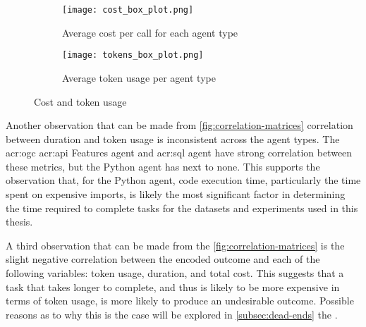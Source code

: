 \begin{figure}[htbp]
    \centering
    \begin{subfigure}[b]{0.48\textwidth}
        \centering
        \texttt{[image: cost\_box\_plot.png]}
        \caption{Average cost per call for each agent type}
        \label{fig:cost-box-plot}
    \end{subfigure}
    \hfill
    \begin{subfigure}[b]{0.48\textwidth}
        \centering
        \texttt{[image: tokens\_box\_plot.png]}
        \caption{Average token usage per agent type}
        \label{fig:tokens-box-plot}
    \end{subfigure}
    \caption{Cost and token usage}
    \label{fig:cost-and-tokens}
\end{figure}

Another observation that can be made from \autoref{fig:correlation-matrices} correlation between duration and token usage is inconsistent across the agent types. The \acrshort{acr:ogc} \acrshort{acr:api} Features agent and \acrshort{acr:sql} agent have strong correlation between these metrics, but the Python agent has next to none. This supports the observation that, for the Python agent, code execution time, particularly the time spent on expensive imports, is likely the most significant factor in determining the time required to complete tasks for the datasets and experiments used in this thesis.

A third observation that can be made from the \autoref{fig:correlation-matrices} is the slight negative correlation between the encoded outcome and each of the following variables: token usage, duration, and total cost. This suggests that a task that takes longer to complete, and thus is likely to be more expensive in terms of token usage, is more likely to produce an undesirable outcome. Possible reasons as to why this is the case will be explored in \autoref{subsec:dead-ends} the .


